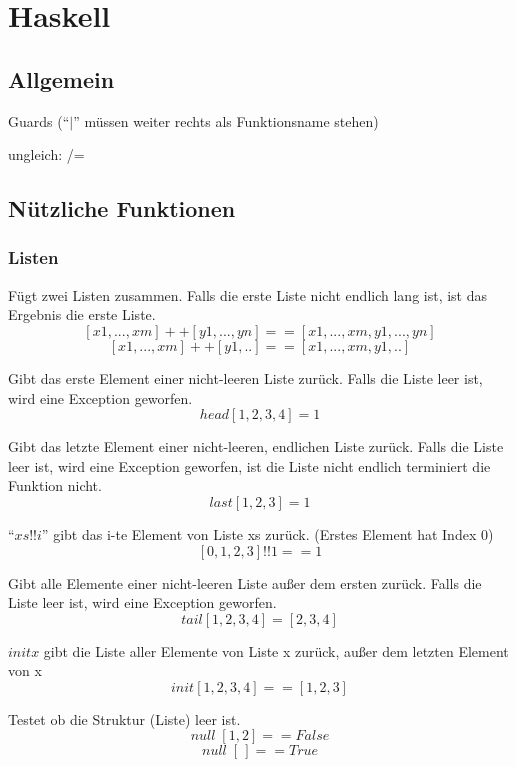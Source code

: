 \lstset{language=Haskell}
\chapter{Haskell}
\section{Allgemein}
\begin{compactitem}
	\item Guards (\enquote{$|$} müssen weiter rechts als Funktionsname stehen)
	\item ungleich: /=
\end{compactitem}
\section{Nützliche Funktionen}
\subsection{Listen}
\funcSignature{(++) :: [a] \rightarrow [a] \rightarrow [a]}
Fügt zwei Listen zusammen. Falls die erste Liste nicht endlich lang ist, ist das Ergebnis die erste Liste.
\example
$$[x1, ..., xm] ++ [y1, ..., yn] == [x1, ..., xm, y1, ..., yn]$$
$$[x1, ..., xm] ++ [y1, ..] == [x1, ..., xm, y1, ..]$$

Gibt das erste Element einer nicht-leeren Liste zurück. Falls die Liste leer ist, wird eine Exception geworfen.
\example
$$ head [1,2,3,4] = 1$$

Gibt das letzte Element einer nicht-leeren, endlichen Liste zurück. Falls die Liste leer ist, wird eine Exception geworfen, ist die Liste nicht endlich terminiert die Funktion nicht.
\example
$$last [1,2,3] = 1$$

\enquote{$xs!!i$} gibt das i-te Element von Liste xs zurück. (Erstes Element hat Index 0)
\example
$$[0,1,2,3]!!1 == 1$$

Gibt alle Elemente einer nicht-leeren Liste außer dem ersten zurück. Falls die Liste leer ist, wird eine Exception geworfen.
\example
$$tail [1,2,3,4] = [2,3,4]$$

$init x$ gibt die Liste aller Elemente von Liste x zurück, außer dem letzten Element von x
\example
$$init [1,2,3,4] == [1,2,3]$$

Testet ob die Struktur (Liste) leer ist.
\example
$$null\; [1,2] == False$$
$$null\; [\,] == True$$

